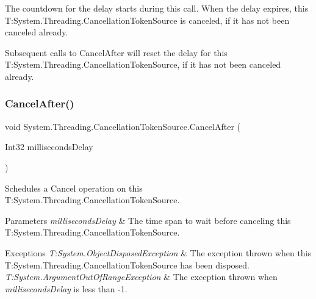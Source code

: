 The countdown for the delay starts during this call. When the delay expires, this T\+:\+System.\+Threading.\+Cancellation\+Token\+Source is canceled, if it has not been canceled already. 

Subsequent calls to Cancel\+After will reset the delay for this T\+:\+System.\+Threading.\+Cancellation\+Token\+Source, if it has not been canceled already. \mbox{\label{class_system_1_1_threading_1_1_cancellation_token_source_a5cc808d20003688249b2f080ebe18c23}} 
\subsubsection{\texorpdfstring{Cancel\+After()}{CancelAfter()}\hspace{0.1cm}{\footnotesize\ttfamily [2/2]}}
{\footnotesize\ttfamily void System.\+Threading.\+Cancellation\+Token\+Source.\+Cancel\+After (\begin{DoxyParamCaption}\item[{Int32}]{milliseconds\+Delay }\end{DoxyParamCaption})\hspace{0.3cm}{\ttfamily [inline]}}



Schedules a Cancel operation on this T\+:\+System.\+Threading.\+Cancellation\+Token\+Source. 


\begin{DoxyParams}{Parameters}
{\em milliseconds\+Delay} & The time span to wait before canceling this T\+:\+System.\+Threading.\+Cancellation\+Token\+Source. \\
\hline
\end{DoxyParams}

\begin{DoxyExceptions}{Exceptions}
{\em T\+:\+System.\+Object\+Disposed\+Exception} & The exception thrown when this T\+:\+System.\+Threading.\+Cancellation\+Token\+Source has been disposed. \\
\hline
{\em T\+:\+System.\+Argument\+Out\+Of\+Range\+Exception} & The exception thrown when {\itshape milliseconds\+Delay}  is less than -\/1. \\
\hline
\end{DoxyExceptions}


